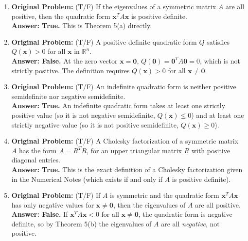 \documentclass[11pt, letterpaper]{article}
\theoremstyle{definition}
\theoremstyle{remark}
\begin{document}
\begin{enumerate}[start=21]
    \item \textbf{Original Problem:} (T/F) If the eigenvalues of a symmetric matrix $A$ are all positive, then the quadratic form $\mathbf{x}^T A \mathbf{x}$ is positive definite. \\
    \textbf{Answer: True.} This is Theorem 5(a) directly.

    \item \textbf{Original Problem:} (T/F) A positive definite quadratic form $Q$ satisfies $Q(\mathbf{x}) > 0$ for all $\mathbf{x}$ in $\mathbb{R}^n$. \\
    \textbf{Answer: False.} At the zero vector $\mathbf{x} = \mathbf{0}$, $Q(\mathbf{0}) = \mathbf{0}^T A \mathbf{0} = 0$, which is not strictly positive. The definition requires $Q(\mathbf{x}) > 0$ for all $\mathbf{x} \ne \mathbf{0}$.

    \item \textbf{Original Problem:} (T/F) An indefinite quadratic form is neither positive semidefinite nor negative semidefinite. \\
    \textbf{Answer: True.} An indefinite quadratic form takes at least one strictly positive value (so it is not negative semidefinite, $Q(\mathbf{x}) \le 0$) and at least one strictly negative value (so it is not positive semidefinite, $Q(\mathbf{x}) \ge 0$).

    \item \textbf{Original Problem:} (T/F) A Cholesky factorization of a symmetric matrix $A$ has the form $A = R^T R$, for an upper triangular matrix $R$ with positive diagonal entries. \\
    \textbf{Answer: True.} This is the exact definition of a Cholesky factorization given in the Numerical Notes (which exists if and only if $A$ is positive definite).

    \item \textbf{Original Problem:} (T/F) If $A$ is symmetric and the quadratic form $\mathbf{x}^T A \mathbf{x}$ has only negative values for $\mathbf{x} \ne \mathbf{0}$, then the eigenvalues of $A$ are all positive. \\
    \textbf{Answer: False.} If $\mathbf{x}^T A \mathbf{x} < 0$ for all $\mathbf{x} \ne \mathbf{0}$, the quadratic form is negative definite, so by Theorem 5(b) the eigenvalues of $A$ are all \emph{negative}, not positive.
\end{enumerate}

\hrulefill
\end{document}
